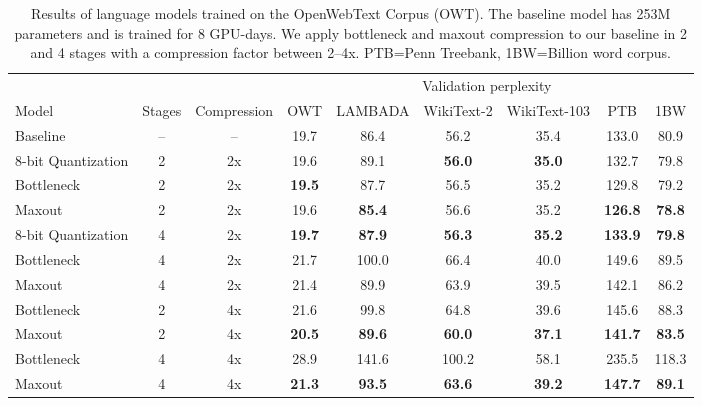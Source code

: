 \begin{table}
\centering
\caption{Results of language models trained on the OpenWebText Corpus (OWT). The baseline model has 253M parameters and is trained for 8 GPU-days. We apply bottleneck and maxout compression to our baseline in 2 and 4 stages with a compression factor between 2--4x. PTB=Penn Treebank, 1BW=Billion word corpus.}
\label{tab:compression}
\begin{tabular}{lcccccccc}\toprule
                &        &             & \multicolumn{6}{c}{Validation perplexity}                        \\ \cmidrule{4-9} 
Model                &  Stages & Compression & OWT & LAMBADA & WikiText-2 & WikiText-103 & PTB    & 1BW   \\\midrule
Baseline        &   --      & -- &   19.7     &  86.4     &    56.2   &    35.4    &  133.0   &   80.9   \\\midrule
8-bit Quantization  &  2      & 2x        &     19.6       &   89.1     &    {\bf 56.0    }  & {\bf   35.0 }        &  132.7   &  79.8    \\
Bottleneck        &   2      & 2x        &   {\bf19.5  }      &  87.7 &     56.5      &    35.2  &  {129.8 }   &   79.2   \\
Maxout  &  2      & 2x        &     19.6       &  {\bf 85.4 }     &     56.6      &   35.2        &  {\bf 126.8 }    &  {\bf78.8  }   \\\midrule
8-bit Quantization  &  4      & 2x        &    {\bf 19.7  }     & {\bf  87.9  }   &    {\bf 56.3    }  & {\bf   35.2 }        &  {\bf133.9 }  &  {\bf79.8}    \\
Bottleneck         &  4      & 2x       &   21.7          &   100.0      &   66.4   &    40.0   &  149.6      &     89.5  \\
Maxout            &  4      & 2x       &  21.4           &  { 89.9  }    & {  63.9 }      &  {     39.5}      & {142.1   }    &   {86.2 }   \\\midrule
Bottleneck        &   2      & 4x        &   21.6          &    99.8     &   64.8        &   39.6          &  145.6      &   88.3    \\
Maxout            &   2      & 4x        & {\bf20.5}      &  {\bf 89.6 }     &   {\bf  60.0}      & {\bf    37.1 }       & {\bf 141.7 }     &  {\bf83.5}     \\\midrule
Bottleneck      & 4  &  4x   &  28.9  &   141.6      &  100.2 &  58.1  &   235.5     &   118.3    \\
Maxout            &  4      & 4x       &   {\bf 21.3} &   {\bf 93.5 }    &  {\bf 63.6  }      & {\bf 39.2}           &   {\bf 147.7 }   & {\bf 89.1  } \\\bottomrule   
\end{tabular}%
\end{table}

